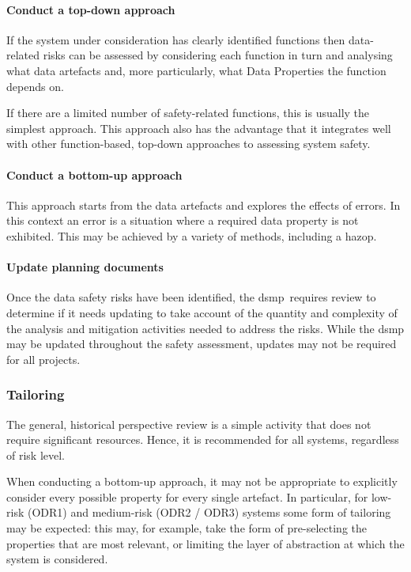 \paragraph{Conduct a top-down approach}
If the system under consideration has clearly identified functions then data-related risks can be assessed by considering each function in turn and analysing what \glspl{data artefact} and, more particularly, what Data Properties the function depends on.

If there are a limited number of safety-related functions, this is usually the simplest approach. This approach also has the advantage that it integrates well with other function-based, top-down approaches to assessing system safety. 

\paragraph{Conduct a bottom-up approach}
This approach starts from the \glspl{data artefact} and explores the effects of \glspl{error}. In this context an error is a situation where a required \gls{data property} is not exhibited. This may be achieved by a variety of methods, including a \gls{hazop}.

\paragraph{Update planning documents}
Once the data safety risks have been identified, the \cbstart\gls{dsmp}\cbend\ requires review to determine if it needs
updating to take account of the quantity and complexity of the analysis and mitigation activities needed to address the risks. While the \gls{dsmp} may be updated throughout the \gls{safety assessment}, updates may not be required for all projects.

\subsubsection{Tailoring}
The general, historical perspective review is a simple activity that does not require significant resources. Hence, it is recommended for all systems, regardless of risk level.

When conducting a bottom-up approach, it may not be appropriate to explicitly consider every possible property for every single artefact. In particular, for low-risk (ODR1) and medium-risk (ODR2 / ODR3) systems some form of tailoring may be expected: this may, for example, take the form of pre-selecting the properties that are most relevant, or limiting the layer of abstraction at which the system is considered.

